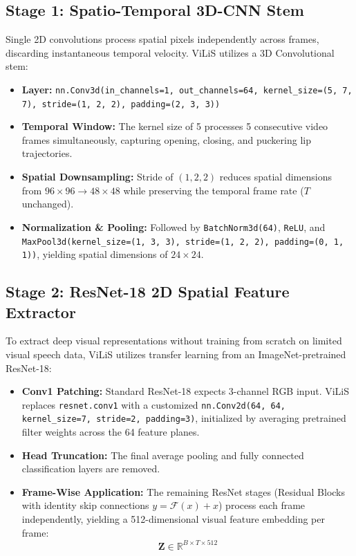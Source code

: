 \documentclass[11pt,a4paper]{article}
\begin{document}
\subsection{Stage 1: Spatio-Temporal 3D-CNN Stem}
Single 2D convolutions process spatial pixels independently across frames, discarding instantaneous temporal velocity. ViLiS utilizes a 3D Convolutional stem:
\begin{itemize}
    \item \textbf{Layer:} \texttt{nn.Conv3d(in\_channels=1, out\_channels=64, kernel\_size=(5, 7, 7), stride=(1, 2, 2), padding=(2, 3, 3))}
    \item \textbf{Temporal Window:} The kernel size of 5 processes 5 consecutive video frames simultaneously, capturing opening, closing, and puckering lip trajectories.
    \item \textbf{Spatial Downsampling:} Stride of $(1, 2, 2)$ reduces spatial dimensions from $96 \times 96 \to 48 \times 48$ while preserving the temporal frame rate ($T$ unchanged).
    \item \textbf{Normalization \& Pooling:} Followed by \texttt{BatchNorm3d(64)}, \texttt{ReLU}, and \texttt{MaxPool3d(kernel\_size=(1, 3, 3), stride=(1, 2, 2), padding=(0, 1, 1))}, yielding spatial dimensions of $24 \times 24$.
\end{itemize}

\subsection{Stage 2: ResNet-18 2D Spatial Feature Extractor}
To extract deep visual representations without training from scratch on limited visual speech data, ViLiS utilizes transfer learning from an ImageNet-pretrained ResNet-18:
\begin{itemize}
    \item \textbf{Conv1 Patching:} Standard ResNet-18 expects 3-channel RGB input. ViLiS replaces \texttt{resnet.conv1} with a customized \texttt{nn.Conv2d(64, 64, kernel\_size=7, stride=2, padding=3)}, initialized by averaging pretrained filter weights across the 64 feature planes.
    \item \textbf{Head Truncation:} The final average pooling and fully connected classification layers are removed.
    \item \textbf{Frame-Wise Application:} The remaining ResNet stages (Residual Blocks with identity skip connections $y = \mathcal{F}(x) + x$) process each frame independently, yielding a 512-dimensional visual feature embedding per frame:
    $$\mathbf{Z} \in \mathbb{R}^{B \times T \times 512}$$
\end{itemize}
\end{document}
